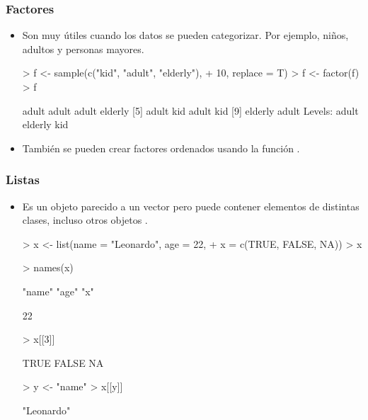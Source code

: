 \begin{frame}
  \frametitle{Factores}
  \begin{itemize}
  \item Son muy \'utiles cuando los datos se pueden categorizar. Por ejemplo, niños, adultos y personas mayores.
\begin{Schunk}
\begin{Sinput}
> f <- sample(c("kid", "adult", "elderly"), 
+     10, replace = T)
> f <- factor(f)
> f
\end{Sinput}
\begin{Soutput}
 [1] adult   adult   adult   elderly
 [5] adult   kid     adult   kid    
 [9] elderly adult  
Levels: adult elderly kid
\end{Soutput}
\end{Schunk}
  \item Tambi\'en se pueden crear factores ordenados usando la funci\'on .
  \end{itemize}
\end{frame}

\begin{frame}
  \frametitle{Listas}
  \begin{itemize}
  \item Es un objeto parecido a un vector pero puede contener elementos de distintas clases, incluso otros objetos .
\begin{Schunk}
\begin{Sinput}
> x <- list(name = "Leonardo", age = 22, 
+     x = c(TRUE, FALSE, NA))
> x
\end{Sinput}
\begin{Sinput}
> names(x)
\end{Sinput}
\begin{Soutput}
[1] "name" "age"  "x"   
\end{Soutput}
\begin{Soutput}
[1] 22
\end{Soutput}
\begin{Sinput}
> x[[3]]
\end{Sinput}
\begin{Soutput}
[1]  TRUE FALSE    NA
\end{Soutput}
\begin{Sinput}
> y <- "name"
> x[[y]]
\end{Sinput}
\begin{Soutput}
[1] "Leonardo"
\end{Soutput}
\end{Schunk}
  \end{itemize}
\end{frame}

